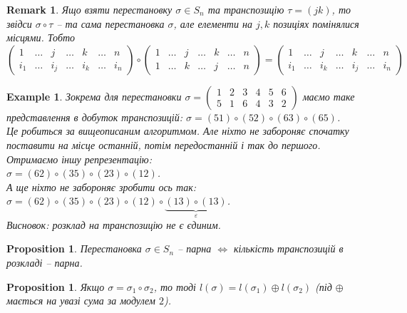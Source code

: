 \documentclass[a4paper, 10pt]{article}
\theoremstyle{theoremdd}
\theoremstyle{theoremdd}
\theoremstyle{theoremdd}
\theoremstyle{theoremdd}
\theoremstyle{theoremdd}
\newtheorem{example}[theorem]{Example}
\theoremstyle{theoremdd}
\theoremstyle{theoremdd}
\theoremstyle{theoremdd}
\theoremstyle{theoremdd}
\newtheorem{proposition}[theorem]{Proposition}
\theoremstyle{theoremdd}
\theoremstyle{theoremdd}
\newtheorem{remark}[theorem]{Remark}
\theoremstyle{theoremdd}
\theoremstyle{theoremdd}
\theoremstyle{theoremdd}
\theoremstyle{theoremdd}
\begin{document}
\begin{remark}
Ящо взяти перестановку $\sigma \in S_n$ та транспозицію $\tau = (jk)$, то звідси $\sigma \circ \tau$ -- та сама перестановка $\sigma$, але елементи на $j,k$ позиціях помінялися місцями. Тобто\\
$\begin{pmatrix}
1 & \dots & j & \dots & k & \dots & n \\
i_1 & \dots & i_j & \dots & i_k & \dots & i_n
\end{pmatrix} \circ \begin{pmatrix}
1 & \dots & j & \dots & k & \dots & n \\
1 & \dots & k & \dots & j & \dots & n
\end{pmatrix} = \begin{pmatrix}
1 & \dots & j & \dots & k & \dots & n \\
i_1 & \dots & i_k & \dots & i_j & \dots & i_n
\end{pmatrix}$
\end{remark}

\begin{example}
Зокрема для перестановки $\sigma = \begin{pmatrix}
1 & 2 & 3 & 4 & 5 & 6 \\
5 & 1 & 6 & 4 & 3 & 2
\end{pmatrix}$ маємо таке представлення в добуток транспозицій: $\sigma = (51) \circ (52) \circ (63) \circ (65)$.\\
Це робиться за вищеописаним алгоритмом. Але ніхто не забороняє спочатку поставити на місце останній, потім передостанній і так до першого. Отримаємо іншу репрезентацію:\\
$\sigma = (62) \circ (35) \circ (23) \circ (12)$.\\
А ще ніхто не забороняє зробити ось так:\\
$\sigma = (62) \circ (35) \circ (23) \circ (12) \circ \underbrace{(13) \circ (13)}_{\varepsilon}$.\\
Висновок: розклад на транспозицію не є єдиним.
\end{example}

\begin{proposition}
Перестановка $\sigma \in S_n$ -- парна $\iff$ кількість транспозицій в розкладі -- парна.
\end{proposition}

\begin{proposition}
Якщо $\sigma = \sigma_1 \circ \sigma_2$, то тоді $l(\sigma) = l(\sigma_1) \oplus l(\sigma_2)$ (під $\oplus$ мається на увазі сума за модулем $2$).
\end{proposition}
\end{document}
